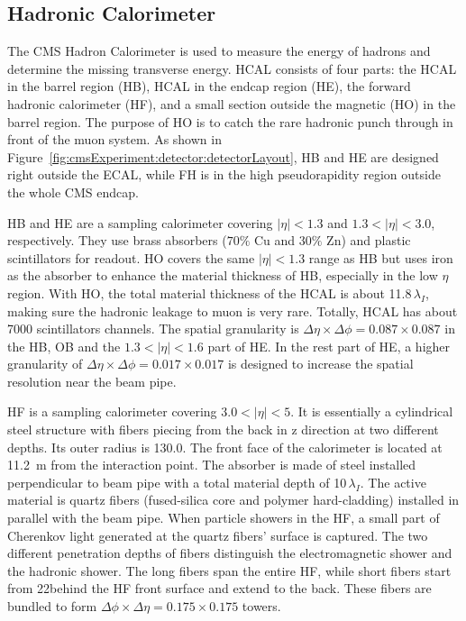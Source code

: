 \subsection{Hadronic Calorimeter}
\label{sec:cmsExperiment:detector:hcal}
The CMS Hadron Calorimeter \cite{cms:hcalTdrCMS:1997xji} is used to measure the energy of hadrons and determine the missing transverse energy. HCAL consists of four parts: the HCAL in the barrel region (HB), HCAL in the endcap region (HE), the forward hadronic calorimeter (HF), and a small section outside the magnetic (HO) in the barrel region. The purpose of HO is to catch the rare hadronic punch through in front of the muon system. As shown in Figure~\ref{fig:cmsExperiment:detector:detectorLayout}, HB and HE are designed right outside the ECAL, while FH is in the high pseudorapidity region outside the whole CMS endcap.

HB and HE are a sampling calorimeter covering $|\eta|< 1.3$ and $1.3<|\eta|< 3.0$, respectively. They use brass absorbers ($70\%$ Cu and $30\%$ Zn) and plastic scintillators for readout. HO covers the same $|\eta|< 1.3$ range as HB but uses iron as the absorber to enhance the material thickness of HB, especially in the low $\eta$ region. With HO, the total material thickness of the HCAL is about 11.8\,$\lambda_I$, making sure the hadronic leakage to muon is very rare. Totally, HCAL has about 7000 scintillators channels. The spatial granularity is $\Delta \eta \times \Delta \phi = 0.087 \times 0.087$ in the HB, OB and the $1.3<|\eta|< 1.6$ part of HE. In the rest part of HE, a higher granularity of $\Delta \eta \times \Delta \phi = 0.017 \times 0.017$ is designed to increase the spatial resolution near the beam pipe.

HF is a sampling calorimeter covering $3.0 < |\eta| < 5$. It is essentially a cylindrical steel structure with fibers piecing from the back in z direction at two different depths. Its outer radius is 130.0\cm. The front face of the calorimeter is located at 11.2~m from the interaction point. The absorber is made of steel installed perpendicular to beam pipe with a total material depth of 10\,$\lambda_I$. The active material is quartz fibers (fused-silica core and polymer hard-cladding) installed in parallel with the beam pipe. When particle showers in the HF, a small part of Cherenkov light generated at the quartz fibers' surface is captured. The two different penetration depths of fibers distinguish the electromagnetic shower and the hadronic shower. The long fibers span the entire HF, while short fibers start from 22\cm behind the HF front surface and extend to the back. These fibers are bundled to form $\Delta \phi \times \Delta \eta = 0.175 \times 0.175$ towers. 


